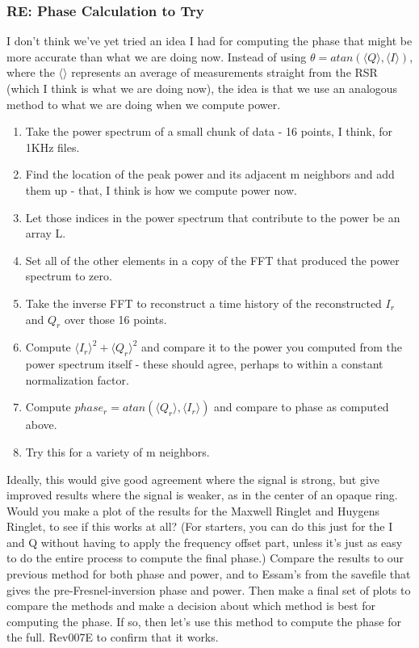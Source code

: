 \documentclass[crop=false,class=book]{standalone}
\begin{document}
        \subsubsection{\footnotesize RE: Phase Calculation to Try}
        I don't think we've yet tried an idea I had for computing the phase that might be more accurate than what we are doing now. Instead of using
        $\theta=atan(\langle Q \rangle,\langle I \rangle)$,
        where the $\langle \rangle$ represents an average of measurements straight from the RSR (which I think is what we are doing now), the idea is that we use an analogous method to what we are doing when we compute power. 
        \begin{enumerate}
            \item Take the power spectrum of a small chunk of data - 16 points, I think, for 1KHz files.
            \item Find the location of the peak power and its adjacent m neighbors and add them up - that, I think is how we compute power now.
            \item Let those indices in the power spectrum that contribute to the power be an array L.
            \item Set all of the other elements in a copy of the FFT that produced the power spectrum to zero.
            \item Take the inverse FFT to reconstruct a time history of the reconstructed $I_r$ and $Q_r$ over those 16 points.
            \item Compute $\langle I_r\rangle^2 + \langle Q_r\rangle^2$ and compare it to the power you computed from the power spectrum itself - these should agree, perhaps to within a constant normalization factor.
            \item Compute $phase_{r} = atan(\langle Q_r\rangle ,\langle I_r \rangle)$ and compare to phase as computed above. 
            \item Try this for a variety of m neighbors.
        \end{enumerate}
        Ideally, this would give good agreement where the signal is strong, but give improved results where the signal is weaker, as in the center of an opaque ring. Would you make a plot of the results for the Maxwell Ringlet and Huygens Ringlet, to see if this works at all? (For starters, you can do this just for the I and Q without having to apply the frequency offset part, unless it's just as easy to do the entire process to compute the final phase.) Compare the results to our previous method for both phase and power, and to Essam's from the savefile that gives the pre-Fresnel-inversion phase and power. Then make a final set of plots to compare the methods and make a decision about which method is best for computing the phase. If so, then let's use this method to compute the phase for the full. Rev007E to confirm that it works.
\end{document}
